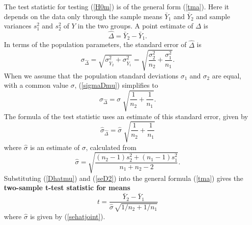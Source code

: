 The test statistic for testing (\ref{H0m}) is of the general form
(\ref{tma}). Here it depends on the data only through the sample means $\bar{Y}_{1}$ and $\bar{Y}_{2}$ and sample
variances $s_{1}^{2}$ and $s_{2}^{2}$ of $Y$ in the two groups.
A point estimate of $\Delta$  is
\begin{equation}
\hat{\Delta}=\bar{Y}_{2}-\bar{Y}_{1}.
\label{Dhatmu}
\end{equation}
In terms of the population parameters, the standard error of
$\hat{\Delta}$ is
\begin{equation}
\sigma_{\hat{\Delta}}=
\sqrt{\sigma^{2}_{\bar{Y}_{2}}+
\sigma^{2}_{\bar{Y}_{1}}}=
\sqrt{
\frac{\sigma^{2}_{2}}{n_{2}}+
\frac{\sigma^{2}_{1}}{n_{1}}
}.
\label{sigmaDmu}
\end{equation}
When we assume that the population standard deviations
$\sigma_{1}$ and $\sigma_{2}$ are equal, with a common value
$\sigma$, (\ref{sigmaDmu}) simplifies to
\begin{equation}
\sigma_{\hat{\Delta}} =
\sigma\; \sqrt{
\frac{1}{n_{2}}+
\frac{1}{n_{1}}
}.
\label{seDpop}
\end{equation}
The formula of the test statistic uses an estimate of this standard
error, given by
\begin{equation}
\hat{\sigma}_{\hat{\Delta}} =
\hat{\sigma} \; \sqrt{\frac{1}{n_{2}}+\frac{1}{n_{1}}}
\label{seD2}
\end{equation}
where $\hat{\sigma}$ is an estimate of $\sigma$,
calculated from
\begin{equation}
\hat{\sigma}=
\sqrt{\frac{(n_{2}-1)s^{2}_{2}+(n_{1}-1)s^{2}_{1}}{n_{1}+n_{2}-2}}.
\label{sehatjoint}
\end{equation}
Substituting (\ref{Dhatmu}) and (\ref{seD2}) into the general formula
(\ref{tma}) gives the \textbf{two-sample t-test statistic for
means}
\begin{equation}
t=
\frac{\bar{Y}_{2}-\bar{Y}_{1}}
{\hat{\sigma}\, \sqrt{1/n_{2}+1/n_{1}}}
\label{ztestmuDb}
\end{equation}
where $\hat{\sigma}$ is given by (\ref{sehatjoint}).

